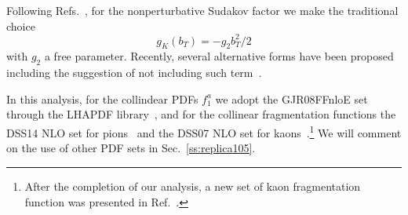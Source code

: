 \documentclass[aps,preprintnumbers,showpacs,nofootinbib,superscriptaddress,floatfix]{revtex4}
\newcommand{\bT}{b_T}
\begin{document}



Following Refs.~\cite{Nadolsky:1999kb,Landry:2002ix,Konychev:2005iy}, for the
nonperturbative Sudakov factor we make the traditional choice 
\begin{equation}
g_K (\bT) = - g_2 \bT^2 / 2
\end{equation} 
with $g_2$ a free parameter. Recently, several alternative
forms have been proposed~\cite{Aidala:2014hva,Collins:2014jpa} including the
suggestion of not including such term~\cite{D'Alesio:2014vja}.  

In this analysis, for the collindear PDFs $f_1^a$ we adopt the GJR08FFnloE
set~\cite{Gluck:2007ck} through the LHAPDF library~\cite{Buckley:2014ana}, and
for the collinear fragmentation functions 
the DSS14 NLO set for
pions~\cite{deFlorian:2014xna} and the DSS07 NLO set for
kaons~\cite{deFlorian:2007aj}.\footnote{After the completion of our analysis, 
a new set of kaon
  fragmentation function was presented in Ref.~\cite{deFlorian:2017lwf}.} We
will comment on the use of other PDF sets in Sec.~\ref{ss:replica105}.
\end{document}
